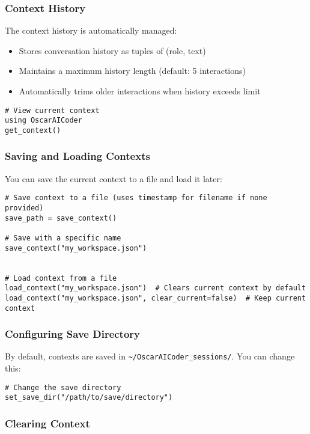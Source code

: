 \documentclass[11pt,a4paper]{article}
\begin{document}
\subsubsection{Context History}

The context history is automatically managed:
\begin{itemize}
    \item Stores conversation history as tuples of (role, text)
    \item Maintains a maximum history length (default: 5 interactions)
    \item Automatically trims older interactions when history exceeds limit
\end{itemize}

\begin{lstlisting}
# View current context
using OscarAICoder
get_context()
\end{lstlisting}

\subsubsection{Saving and Loading Contexts}

You can save the current context to a file and load it later:

\begin{lstlisting}
# Save context to a file (uses timestamp for filename if none provided)
save_path = save_context()

# Save with a specific name
save_context("my_workspace.json")


# Load context from a file
load_context("my_workspace.json")  # Clears current context by default
load_context("my_workspace.json", clear_current=false)  # Keep current context
\end{lstlisting}

\subsubsection{Configuring Save Directory}

By default, contexts are saved in \texttt{\textasciitilde/OscarAICoder\_sessions/}. You can change this:

\begin{lstlisting}
# Change the save directory
set_save_dir("/path/to/save/directory")
\end{lstlisting}

\subsubsection{Clearing Context}
\end{document}
